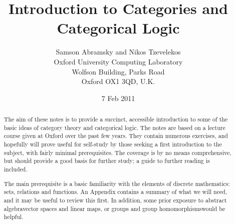 \documentclass[12pt]{article}
\begin{document}
\title{Introduction to Categories and Categorical Logic}
\author{Samson Abramsky and Nikos Tzevelekos\\Oxford University Computing Laboratory\\Wolfson Building, Parks Road \\ Oxford OX1 3QD, U.K.}
\date{7 Feb 2011}
\maketitle

\begin{abstract}
The aim of these notes is to provide a succinct, accessible introduction to some of the basic ideas of category theory and categorical logic. The notes are based on a lecture course given at Oxford over the past few years. They contain numerous exercises, and hopefully will prove useful for self-study by those seeking a first introduction to the subject, with fairly minimal prerequisites. The coverage is by no means comprehensive, but should provide a good basis for further study; a  guide to further reading is included.

The main prerequisite is a basic familiarity with the elements of discrete mathematics: sets, relations and functions. An Appendix contains a summary of what we will need, and it may be useful to review this first.
In addition, some prior exposure to abstract algebra\HY vector spaces and linear maps, or groups and group homomorphisms\HY would be helpful.
\end{abstract}

\newpage
\setcounter{tocdepth}{2}
\tableofcontents\listoftables

\newpage
\end{document}

